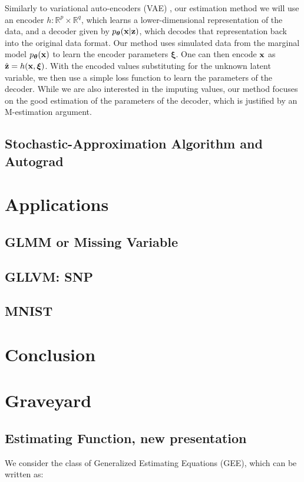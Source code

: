 \documentclass[twoside,11pt]{article}
\begin{document}
Similarly to variational auto-encoders (VAE) \cite{kingma2014autoencoding}, our estimation method we will use an encoder $h: \mathbb R^p \times \mathbb R^q$, which learns a lower-dimensional representation of the data, and a decoder given by $p_{\bm{\theta}}({\bf x}|{\bf z})$, which decodes that representation back into the original data format. Our method uses simulated data from the marginal model $p_{\bm{\theta}}({\bf x})$ to learn the encoder parameters $\bm\xi$. One can then encode ${\bf x}$ as $\hat{{\bf z}} = h({\bf x}, \bm\xi)$. With the encoded values substituting for the unknown latent variable, we then use a simple loss function to learn the parameters of the decoder. While we are also interested in the imputing values, our method focuses on the good estimation of the parameters of the decoder, which is justified by an M-estimation argument. 

\subsection{Stochastic-Approximation Algorithm and Autograd}
\section{Applications}
\subsection{GLMM or Missing Variable}
\subsection{GLLVM: SNP}
\subsection{MNIST}
\section{Conclusion}
\newpage

\section{Graveyard}


\subsection{Estimating Function, new presentation}
We consider the class of Generalized Estimating Equations (GEE), which can be written as:
\end{document}
